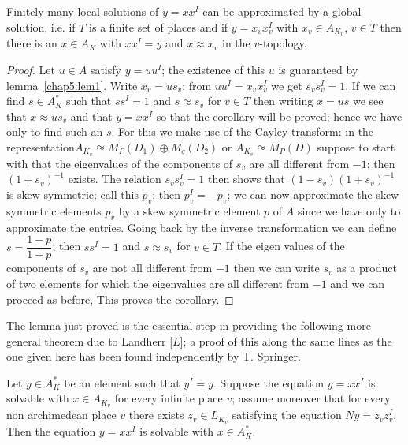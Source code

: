 \begin{coro*}
Finitely many local solutions of $y=xx^{I}$ can be approximated by a
global solution, i.e. if $T$ is a finite set of places and if
$y=x_vx_v^I$ with $x_v \in A_{K_v}$, $v \in T$ then there is an $x \in
A_K$ with $xx^I = y$ and $x \approx x_v$ in the $v$-topology. 
\end{coro*}

\begin{proof}
Let $u \in A$ satisfy $y=uu^I$; the existence of this $u$ is
guaranteed by lemma~\ref{chap5:lem1}. Write $x_v = us_v$; from $uu^I=x_v x_v^I$ we
get $s_vs_v^I = 1$. If we can find $s \in A_K^*$ such that $ss^I = 1$
and $s \approx s_v$ for $v \in T$ then writing $x = us$ we see that
$x \approx us_v$ and that $y = xx^I$ so that the corollary will be
proved; hence we have only to find such an $s$. For this we make use
of the Cayley transform: in the representation\pageoriginale $A_{K_v}
\approxeq M_P(D_1)\oplus M_q (D_2)$ or $A_{K_v} \approxeq M_P(D)$ suppose to
start with that the eigenvalues of the components of $s_v$ are all
different from $-1$; then $(1+s_v)^{-1}$ exists. The relation
$s_vs_v^{I} = 1$ then shows that $(1-s_v)(1+s_v)^{-1}$ is skew
symmetric; call this $p_v$; then $p^I_v=-p_v$; we can now approximate
the skew symmetric elements $p_v$ by a skew symmetric element $p$ of
$A$ since we have only to approximate the entries. Going back by the
inverse transformation we can define $s = \dfrac{1-p}{1+p}$; then
$ss^I = 1$ and $s \approx s_v$ for $v \in T$. If the eigen values of
the components of $s_v$ are not all different from $-1$ then we can
write $s_v$ as a product of two elements for which the eigenvalues are
all different from $-1$ and we can proceed as before, This proves the
corollary. 
\end{proof}

The lemma just proved is the essential step in providing the following
more general theorem due to Landherr [$L$]; a proof of this along the
same lines as the one given here has been found independently by
T. Springer. 

\medskip
{}
Let $y \in A_K^*$ be an element such that $y^I = y$. Suppose the
equation $y = xx^I$ is solvable with $x \in A_{K_v}$ for  every
infinite place $v$; assume moreover that for every non archimedean
place $v$ there exists $ z_v \in L_{K_v}$ satisfying the equation $Ny
= z_v z_v^I$. Then the equation $y = xx^I$ is solvable with $x \in
A_K^*$. 

